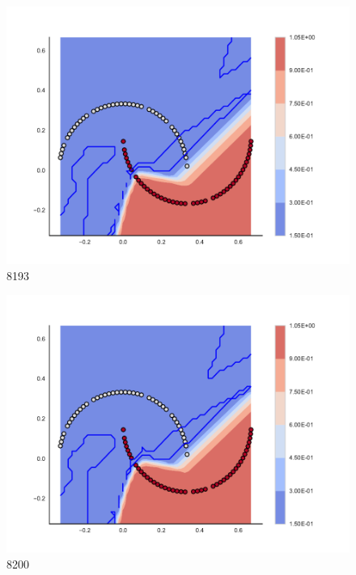 \begin{subfigure}[b]{0.09\textwidth}
    \includegraphics[clip, trim=2.35cm 1.75cm 4.5cm 0cm,width=\textwidth]{img/convergence/8193.pdf}
    \caption{8193}
    \label{fig:convergence_8193}
\end{subfigure}
%
\begin{subfigure}[b]{0.09\textwidth}
    \includegraphics[clip, trim=2.35cm 1.75cm 4.5cm 0cm,width=\textwidth]{img/convergence/8200.pdf}
    \caption{8200}
    \label{fig:convergence_8200}
\end{subfigure}
%
